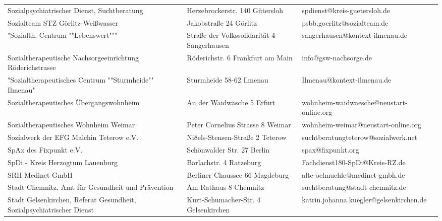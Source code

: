{\begin{xltabular}{\textwidth} {
 >{\raggedright\arraybackslash}p{5cm}
 >{\raggedright\arraybackslash}X
 >{\raggedright\arraybackslash}p{5cm} }
Sozialpsychiatrischer Dienst, Suchtberatung & Herzebrockerstr. 140 Gütersloh & spdienst@kreis-guetersloh.de \\
Sozialteam STZ Görlitz-Weißwasser & Jakobstraße 24 Görlitz & psbb.goerlitz@sozialteam.de \\
"Sozialth. Centrum ""Lebenswert""" & Straße der Volkssolidarität 4 Sangerhausen & sangerhausen@kontext-ilmenau.de \\
Sozialtherapeutische Nachsorgeeinrichtung Röderichstrasse & Röderichstr. 6 Frankfurt am Main & info@gsw-nachsorge.de \\
"Sozialtherapeutisches Centrum ""Sturmheide"" Ilmenau" & Sturmheide 58-62 Ilmenau & Ilmenau@kontext-ilmenau.de \\
Sozialtherapeutisches Übergangswohnheim & An der Waidwäsche 5 Erfurt & wohnheim-waidwaesche@neustart-online.org \\
Sozialtherapeutisches Wohnheim Weimar & Peter Cornelius Strasse 8 Weimar & wohnheim-weimar@neustart-online.org \\
Sozialwerk der EFG Malchin Teterow e.V. & Ni8els-Stensen-Straße 2 Teterow & suchtberatungteterow@sozialwerk.net \\
SpAx des Fixpunkt e.V. & Schönwalder Str. 27 Berlin & spax@fixpunkt.org \\
SpDi - Kreis Herzogtum Lauenburg & Barlachstr. 4 Ratzeburg & Fachdienst180-SpDi@Kreis-RZ.de \\
SRH Medinet GmbH & Berliner Chaussee 66 Magdeburg & alte-oelmuehle@medinet-gmbh.de \\
Stadt Chemnitz, Amt für Gesundheit und Prävention & Am Rathaus 8 Chemnitz & suchtberatung@stadt-chemnitz.de \\
Stadt Gelsenkirchen, Referat Gesundheit, Sozialpsychiatrischer Dienst & Kurt-Schumacher-Str. 4 Gelsenkirchen & katrin.johanna.kuegler@gelsenkirchen.de \\

\end{xltabular}}
